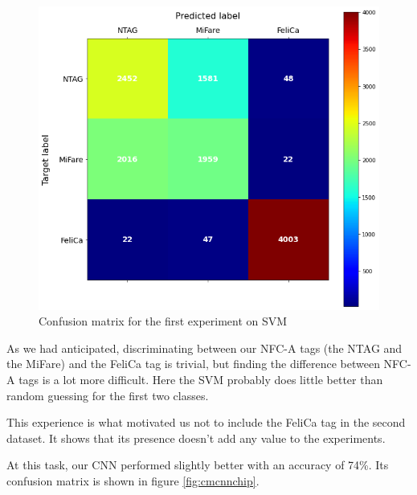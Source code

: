 \begin{figure}[htbp!]
  \centering
  \includegraphics[scale=0.5]{figures/ml_svmchip512.png}
  \caption{Confusion matrix for the first experiment on SVM}
  \label{fig:cmsvmchip}
\end{figure}

As we had anticipated, discriminating between our NFC-A tags (the NTAG and the MiFare) and the FeliCa tag is trivial, but finding the difference between NFC-A tags is a lot more difficult. Here the SVM probably does little better than random guessing for the first two classes.

This experience is what motivated us not to include the FeliCa tag in the second dataset. It shows that its presence doesn't add any value to the experiments.

At this task, our CNN performed slightly better with an accuracy of 74\%. Its confusion matrix is shown in figure \ref{fig:cmcnnchip}.

